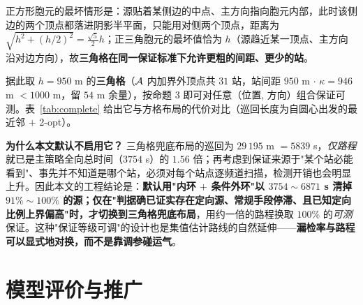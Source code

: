 正方形胞元的最坏情形是：源贴着某侧边的中点、主方向指向胞元内部，此时该侧边的两个顶点都落进阴影半平面，只能用对侧两个顶点，距离为 $\sqrt{h^2+(h/2)^2}=\tfrac{\sqrt5}{2}h$；正三角胞元的最坏值恰为 $h$（源趋近某一顶点、主方向沿对边方向），故\textbf{三角格在同一保证标准下允许更粗的间距、更少的站}。

据此取 $h=950$ m 的\textbf{三角格}（$\mathcal{A}$ 内加界外顶点共 $31$ 站，站间距 $950$ m $\cdot$ $\kappa=946$ m $<1000$ m，留 $54$ m 余量），按命题 3 即可对任意（位置, 方向）组合保证可测。表~\ref{tab:complete} 给出它与方格布局的代价对比（巡回长度为自圆心出发的最近邻 $+$ 2-opt）。

\begin{table}[H]
\centering
\caption{严格保证布局的站数与巡回代价（\texttt{q4\_complete.py} 复算；每种布局各做 $2\times10^5$ 次随机（位置, 方向）抽样，失败率均为 $0$）}
\label{tab:complete}
\small
\setlength{\tabcolsep}{4.5pt}
\end{table}

\noindent\textbf{为什么本文默认不启用它？} 三角格兜底布局的巡回为 $29\,195$ m $=5839$ s，\emph{仅路程}就已是主策略全向总时间（$3754$ s）的 $1.56$ 倍；再考虑到保证来源于"某个站必能看到"、事先并不知道是哪个站，必须对每个站点逐频道扫描，检测开销也会明显上升。因此本文的工程结论是：\textbf{默认用"内环 $+$ 条件外环"以 $3754\!\sim\!6871$ s 清掉 $91\%\!\sim\!100\%$ 的源；仅在"判据确已证实存在定向源、常规手段停滞、且已知定向比例上界偏高"时，才切换到三角格兜底布局}，用约一倍的路程换取 $100\%$ 的\emph{可测}保证。这种"保证等级可调"的设计也是集值估计路线的自然延伸——\textbf{漏检率与路程可以显式地对换，而不是靠调参碰运气}。

\section{模型评价与推广}

